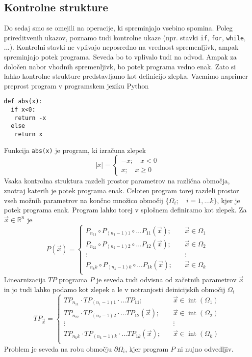 \documentclass{article}
\newcommand{\RR}{\mathbb{R}}
\DeclareMathOperator{\interior}{int}
\begin{document}
\subsection{Kontrolne strukture}

Do sedaj smo se omejili na operacije, ki spreminjajo vsebino spomina. Poleg
prireditvenih ukazov, poznamo tudi kontrolne ukaze (npr. stavki \texttt{if},
\texttt{for}, \texttt{while}, ...). Kontrolni stavki ne vplivajo neposredno na
vrednost spremenljivk, ampak spreminjajo potek programa. Seveda bo to vplivalo
tudi na odvod. Ampak za določen nabor vhodnih spremenljivk, bo potek programa
vedno enak. Zato si lahko kontrolne strukture predstavljamo kot definicijo
zlepka. Vzemimo naprimer preprost program v programskem jeziku Python
\begin{verbatim}
def abs(x):
  if x<0:
   return -x
  else
   return x
\end{verbatim}
Funkcija \texttt{abs(x)} je program, ki izračuna zlepek
\begin{equation}
  \label{eq:zlepek}
  |x| =
  \begin{cases}
    -x;\quad x<0\\
    x;\quad x\ge 0
  \end{cases}
\end{equation}
Vsaka kontrolna struktura razdeli prostor parametrov na različna območja,
znotraj katerih je potek programa enak. Celoten program torej razdeli prostor
vseh možnih parametrov na končno množico območij $\{\Omega_i;\quad i=1,\ldots
k\}$, kjer je potek programa enak. Program lahko torej v splošnem definiramo kot
zlepek. Za $\vec{x}\in\RR^n$ je
\begin{equation}
  \label{eq:zlrprk_splosno}
  P(\vec{x}) =
  \begin{cases}
    P_{n_11}\circ P_{(n_1-1)1}\circ\ldots P_{11}(\vec{x});&\quad \vec{x}\in\Omega_1\\
    P_{n_22}\circ P_{(n_2-1)2}\circ\ldots P_{12}(\vec{x});&\quad \vec{x}\in\Omega_2\\
    \vdots&\quad\vdots\\
    P_{n_kk}\circ P_{(n_k-1)k}\circ\ldots P_{1k}(\vec{x});&\quad \vec{x}\in\Omega_k\\
  \end{cases}
\end{equation}
Linearnizacija $TP$ programa $P$ je seveda tudi odvisna od začetnih parametrov
$\vec{x}$ in jo tudi lahko podamo kot zlepek a le v notranjosti deinicijskih območij $\Omega_i$
\begin{equation}
  \label{eq:zlrprk_splosno}
  TP_{\vec{x}} =
  \begin{cases}
    TP_{n_11}\cdot TP_{(n_1-1)1}\cdot\ldots TP_{11};&\quad \vec{x}\in\interior(\Omega_1)\\
    TP_{n_22}\cdot TP_{(n_2-1)2}\cdot\ldots TP_{12}(\vec{x});&\quad \vec{x}\in\interior(\Omega_2)\\
    \vdots&\quad\vdots\\
    TP_{n_kk}\cdot TP_{(n_k-1)k}\cdot\ldots TP_{1k}(\vec{x});&\quad \vec{x}\in\interior(\Omega_k)\\
  \end{cases}
\end{equation}
Problem je seveda na robu območju $\partial\Omega_i$, kjer program $P$ ni nujno odvedljiv.
\end{document}
